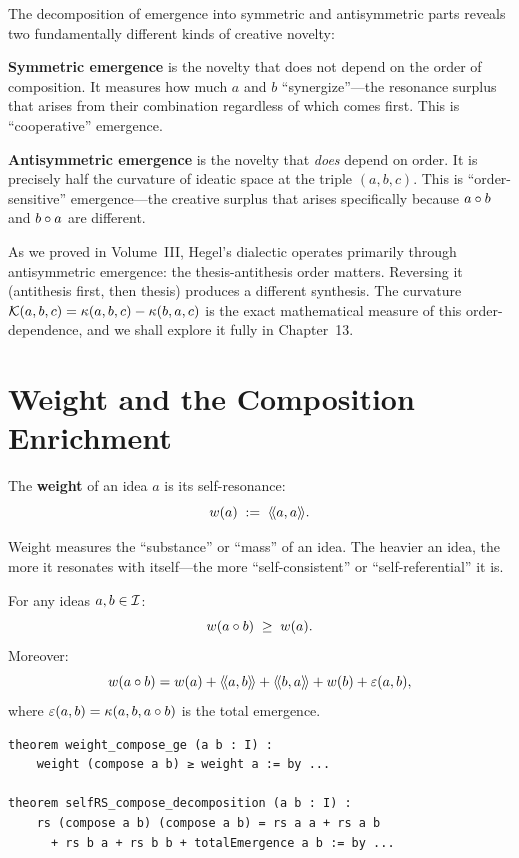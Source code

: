 \begin{interpretation}
The decomposition of emergence into symmetric and antisymmetric parts reveals
two fundamentally different kinds of creative novelty:

\textbf{Symmetric emergence} is the novelty that does not depend on the order
of composition. It measures how much $a$ and $b$ ``synergize''---the resonance
surplus that arises from their combination regardless of which comes first. This
is ``cooperative'' emergence.

\textbf{Antisymmetric emergence} is the novelty that \emph{does} depend on order.
It is precisely half the curvature of ideatic space at the triple $(a,b,c)$.
This is ``order-sensitive'' emergence---the creative surplus that arises
specifically because $a \circ b$ and $b \circ a$ are different.

As we proved in Volume~III, Hegel's dialectic operates primarily through
antisymmetric emergence: the thesis-antithesis order matters. Reversing it
(antithesis first, then thesis) produces a different synthesis. The curvature
$\mathcal{K}(a,b,c) = \kappa(a,b,c) - \kappa(b,a,c)$ is the exact mathematical
measure of this order-dependence, and we shall explore it fully in Chapter~13.
\end{interpretation}


\section{Weight and the Composition Enrichment}

\begin{definition}[Weight]
\label{def:weight}
The \textbf{weight} of an idea $a$ is its self-resonance:
\[
  w(a) \;:=\; \langle\!\langle a, a \rangle\!\rangle.
\]
\end{definition}

Weight measures the ``substance'' or ``mass'' of an idea. The heavier an idea,
the more it resonates with itself---the more ``self-consistent'' or
``self-referential'' it is.

\begin{theorem}
\label{thm:composition-enriches}
For any ideas $a, b \in \mathcal{I}$:
\[
  w(a \circ b) \;\geq\; w(a).
\]
Moreover:
\[
  w(a \circ b) = w(a) + \langle\!\langle a, b \rangle\!\rangle + \langle\!\langle b, a \rangle\!\rangle + w(b) + \varepsilon(a,b),
\]
where $\varepsilon(a,b) = \kappa(a, b, a \circ b)$ is the total emergence.
\end{theorem}

\begin{lstlisting}[caption={Weight and enrichment (IDT\_v3\_Emergence.lean)}]
theorem weight_compose_ge (a b : I) :
    weight (compose a b) ≥ weight a := by ...

theorem selfRS_compose_decomposition (a b : I) :
    rs (compose a b) (compose a b) = rs a a + rs a b
      + rs b a + rs b b + totalEmergence a b := by ...
\end{lstlisting}

